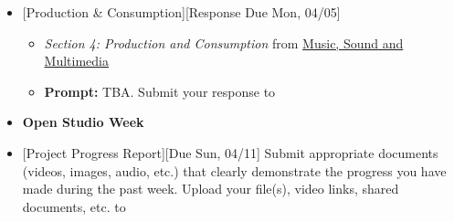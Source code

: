 \def\dMon{Mon, 04/05}
\def\dTues{Tues, 04/06}
\def\dWed{Wed, 04/07}
\def\dThur{Thur, 04/08}
\def\dFri{Fri, 04/09}
\def\dSat{Sat, 04/10}
\def\dSun{Sun, 04/11}
\placeDate

\begin{itemize}[noitemsep,topsep=0pt,leftmargin=*]
	\item {}[Production \& Consumption][Response Due \dMon]
	      \begin{itemize}
		      \item \emph{Section 4: Production and Consumption} from \href{supplements/Music_Sound_and_Multimedia_-_From_the_Live_to_the_Virtual_(Music_and_the_Moving_Image)_(2008).pdf}{Music, Sound and Multimedia}
		      \item \textbf{Prompt:} TBA. Submit your response to \discordR
	      \end{itemize}
	\item \textcolor{defaultColor}{\textbf{Open Studio Week}}
	\item {}[Project Progress Report][Due \dSun] \newline
	      Submit appropriate documents (videos, images, audio, etc.) that clearly demonstrate the progress you have made during the past week. Upload your file(s), video links, shared documents, etc. to \discordE
\end{itemize}